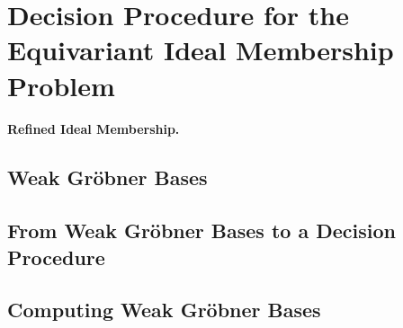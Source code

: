 \section{Decision Procedure for the Equivariant Ideal Membership Problem}
\label{sec:algorithm}

\paragraph{Refined Ideal Membership.}


\subsection{Weak Gröbner Bases}
\label{subsec:weakgb}

\subsection{From Weak Gröbner Bases to a Decision Procedure}
\label{subsec:weakgb2dec}

\subsection{Computing Weak Gröbner Bases}
\label{subsec:weakgbcomp}

